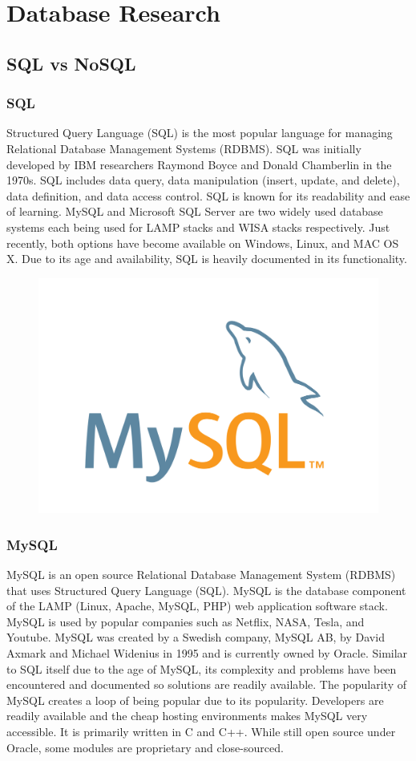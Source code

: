 \documentclass[12pt]{article}
\begin{document}
\section{Database Research}

\subsection{SQL vs NoSQL}

\subsubsection{SQL}

Structured Query Language (SQL) is the most popular language for managing Relational Database Management Systems (RDBMS).  SQL was initially developed by IBM researchers Raymond Boyce and Donald Chamberlin in the 1970s.\cite{sql}  SQL includes data query, data manipulation (insert, update, and delete), data definition, and data access control.\cite{sql}  SQL is known for its readability and ease of learning.  MySQL and Microsoft SQL Server are two widely used database systems each being used for LAMP stacks and WISA stacks respectively.  Just recently, both options have become available on Windows, Linux, and MAC OS X.  Due to its age and availability, SQL is heavily documented in its functionality.

\begin{figure}[h]
	\centering
	\includegraphics[width=0.251\linewidth]{mysql}
\end{figure}

\subsubsection{MySQL}

MySQL is an open source Relational Database Management System (RDBMS) that uses Structured Query Language (SQL).\cite{mysql}  MySQL is the database component of the LAMP (Linux, Apache, MySQL, PHP) web application software stack.  MySQL is used by popular companies such as Netflix, NASA, Tesla, and Youtube.  MySQL was created by a Swedish company, MySQL AB, by David Axmark and Michael Widenius in 1995 and is currently owned by Oracle.  Similar to SQL itself due to the age of MySQL, its complexity and problems have been encountered and documented so solutions are readily available.  The popularity of MySQL creates a loop of being popular due to its popularity.  Developers are readily available and the cheap hosting environments makes MySQL very accessible.  It is primarily written in C and C++.  While still open source under Oracle, some modules are proprietary and close-sourced.
\end{document}
